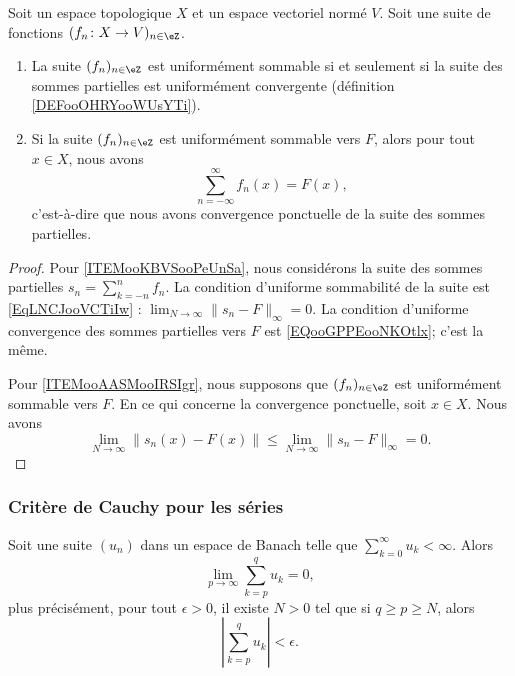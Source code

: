 \begin{proposition}	\label{PROPooYLCRooOXsOkb}
	Soit un espace topologique \( X\) et un espace vectoriel normé \( V\). Soit une suite de fonctions \( (f_n \colon X\to V )_{n\in \eZ}\).
	\begin{enumerate}
		\item		\label{ITEMooKBVSooPeUnSa}
		      La suite \( (f_n)_{n\in \eZ}\) est uniformément sommable si et seulement si la suite des sommes partielles est uniformément convergente (définition \ref{DEFooOHRYooWUsYTi}).
		\item		\label{ITEMooAASMooIRSIgr}
		      Si la suite \( (f_n)_{n\in\eZ}\) est uniformément sommable vers \( F\), alors pour tout \( x\in X\), nous avons
		      \begin{equation}
			      \sum_{n=-\infty}^{\infty}f_n(x)=F(x),
		      \end{equation}
		      c'est-à-dire que nous avons convergence ponctuelle de la suite des sommes partielles.
	\end{enumerate}
\end{proposition}

\begin{proof}
	Pour \ref{ITEMooKBVSooPeUnSa}, nous considérons la suite des sommes partielles \( s_n=\sum_{k=-n}^nf_n\). La condition d'uniforme sommabilité de la suite est \eqref{EqLNCJooVCTiIw} : \( \lim_{N\to \infty}\| s_n-F \|_{\infty}=0\). La condition d'uniforme convergence des sommes partielles vers \( F\) est \eqref{EQooGPPEooNKOtlx}; c'est la même.

	Pour \ref{ITEMooAASMooIRSIgr}, nous supposons que \( (f_n)_{n\in \eZ}\) est uniformément sommable vers \( F\). En ce qui concerne la convergence ponctuelle, soit \( x\in X\). Nous avons
	\begin{equation}
		\lim_{N\to \infty}\| s_n(x)-F(x) \|\leq \lim_{N\to \infty}\| s_n-F \|_{\infty}=0.
	\end{equation}
\end{proof}


\subsubsection{Critère de Cauchy pour les séries}

\begin{proposition}	\label{PROPooNNMFooUHMcSE}
	Soit une suite \( (u_n)\) dans un espace de Banach telle que \( \sum_{k=0}^{\infty}u_k<\infty\). Alors
	\begin{equation}
		\lim_{p\to \infty}\sum_{k=p}^qu_k=0,
	\end{equation}
	plus précisément, pour tout \( \epsilon>0\), il existe \( N>0\) tel que si \( q\geq p\geq N\), alors
	\begin{equation}
		|\sum_{k=p}^q u_k |<\epsilon.
	\end{equation}
\end{proposition}

